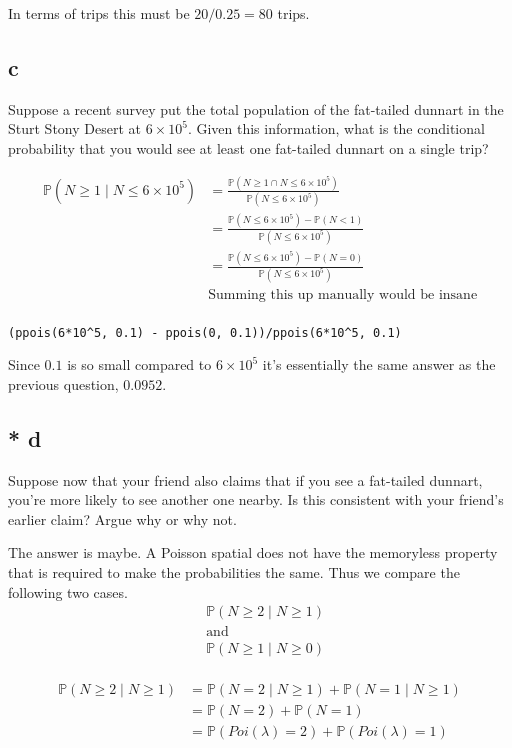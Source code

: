 \documentclass{article}
\newcommand{\prob}{\mathbb{P}}
\begin{document}
In terms of trips this must be $20/0.25 = 80$ trips.

\subsection{c}
Suppose a recent survey put the total population of the fat-tailed dunnart in
the Sturt Stony Desert at $6 \times 10^5$. Given this information, what is the
conditional probability that you would see at least one fat-tailed dunnart on a
single trip?

\begin{align*}
    \prob(N \geq 1 \;|\; N \leq 6 \times 10^5)
    &= \frac{\prob(N \geq 1 \cap N \leq 6 \times 10^5)}
    {\prob(N \leq 6 \times 10^5)} \\
    &= \frac{\prob(N \leq 6 \times 10^5) - \prob(N < 1)}
    {\prob(N \leq 6 \times 10^5)} \\
    &= \frac{\prob(N \leq 6 \times 10^5) - \prob(N = 0)}
    {\prob(N \leq 6 \times 10^5)} \\
    &\text{Summing this up manually would be insane} \\
\end{align*}

\begin{verbatim}
(ppois(6*10^5, 0.1) - ppois(0, 0.1))/ppois(6*10^5, 0.1)
\end{verbatim}

Since $0.1$ is so small compared to $6 \times 10^5$ it's essentially the same
answer as the previous question, $0.0952$.

\subsection{* d}
Suppose now that your friend also claims that if you see a fat-tailed dunnart,
you're more likely to see another one nearby. Is this consistent with your
friend's earlier claim? Argue why or why not.

The answer is maybe.
A Poisson spatial does not have the memoryless property that
is required to make the probabilities the same. Thus we compare the following
two cases.
\begin{align*}
    &\prob(N \geq 2 \;|\; N \geq 1) \\
    &\text{and} \\
    &\prob(N \geq 1 \;|\; N \geq 0) \\
\end{align*}

\begin{align*}
    \prob(N \geq 2 \;|\; N \geq 1)
    &= \prob(N = 2 \;|\; N \geq 1) + \prob(N = 1 \;|\; N \geq 1) \\
    &= \prob(N = 2) + \prob(N = 1) \\
    &= \prob(Poi(\lambda) = 2) + \prob(Poi(\lambda) = 1) \\
\end{align*}
\end{document}
